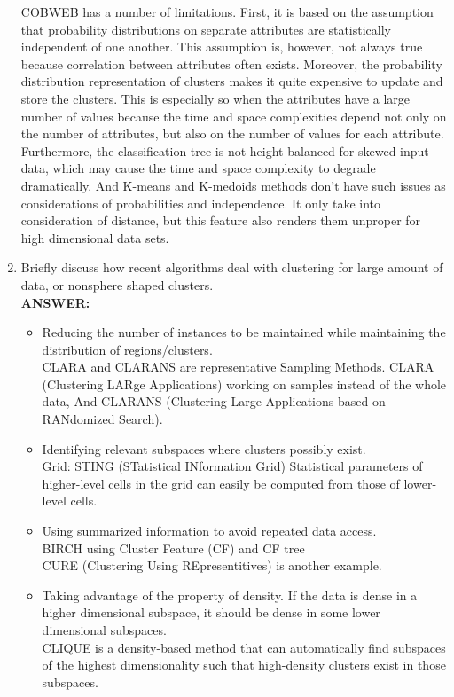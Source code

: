 \documentclass{article}
\begin{document}
\begin{enumerate}
COBWEB has a number of limitations. First, it is based on the
assumption that probability distributions on separate attributes are
statistically independent of one another. This assumption is,
however, not always true because correlation between attributes often
exists. Moreover, the probability distribution representation of
clusters makes it quite expensive to update and store the
clusters. This is especially so when the attributes have a large
number of values because the time and space complexities depend not
only on the number of attributes, but also on the number of values for
each attribute. Furthermore, the classification tree is not
height-balanced for skewed input data, which may cause the time and
space complexity to degrade dramatically. And K-means and K-medoids
methods don't have such issues as considerations of probabilities and
independence. It only take into consideration of distance, but this
feature also renders them unproper for high dimensional data sets. 

\item Briefly discuss how recent algorithms deal with clustering for
  large amount of data, or nonsphere shaped clusters.  \\
\textbf{ANSWER:}
\vspace{-10pt}
\begin{itemize}
\item Reducing the number of instances to be maintained
  while maintaining the distribution of regions/clusters.\\
  CLARA and CLARANS are representative Sampling Methods. 
  CLARA (Clustering LARge Applications) working on samples instead of
  the whole data, And CLARANS (Clustering Large Applications based on
  RANdomized Search).
  
\item Identifying relevant subspaces where clusters possibly exist.\\
  Grid: STING (STatistical INformation Grid) Statistical parameters of
  higher-level cells in the grid can easily be computed from those of
  lower-level cells.
  
\item Using summarized information to avoid repeated data access.\\
  BIRCH using Cluster Feature (CF) and CF tree \\
  CURE (Clustering Using REpresentitives) is another example. 
  
\item Taking advantage of the property of density. If the data is
  dense in a higher dimensional subspace, it should be dense in some
  lower dimensional subspaces. \\
  CLIQUE is a density-based method that can automatically find subspaces
  of the highest dimensionality such that high-density clusters exist in
  those subspaces.
\end{itemize}


\end{enumerate}
\end{document}
